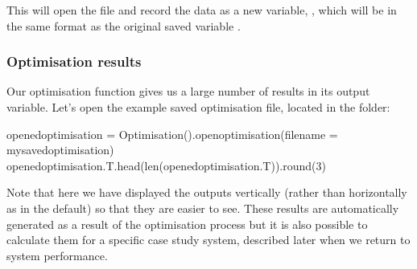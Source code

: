 \documentclass[letterpaper,10pt,english]{sphinxmanual}
\begin{document}
\begin{sphinxVerbatim}[commandchars=\\\{\}]
    
\end{sphinxVerbatim}

\sphinxAtStartPar
This will open the  file and record the
data as a new variable, , which will be in the
same format as the original saved variable .


\subsubsection{Optimisation results}
\label{\detokenize{optimisation:optimisation-results}}
\sphinxAtStartPar
Our optimisation function gives us a large number of results in its
output variable. Let’s open the example saved optimisation file, located
in the  folder:

\begin{sphinxVerbatim}[commandchars=\\\{\}]
opened\PYGZus{}optimisation = Optimisation().open\PYGZus{}optimisation(filename = \PYGZsq{}my\PYGZus{}saved\PYGZus{}optimisation\PYGZsq{})
opened\PYGZus{}optimisation.T.head(len(opened\PYGZus{}optimisation.T)).round(3)
\end{sphinxVerbatim}



\begin{DUlineblock}{0em}
\item[] 
\end{DUlineblock}

\sphinxAtStartPar
Note that here we have displayed the outputs vertically (rather than
horizontally as in the default) so that they are easier to see. These
results are automatically generated as a result of the optimisation
process but it is also possible to calculate them for a specific case
study system, described later when we return to system performance.
\end{document}
